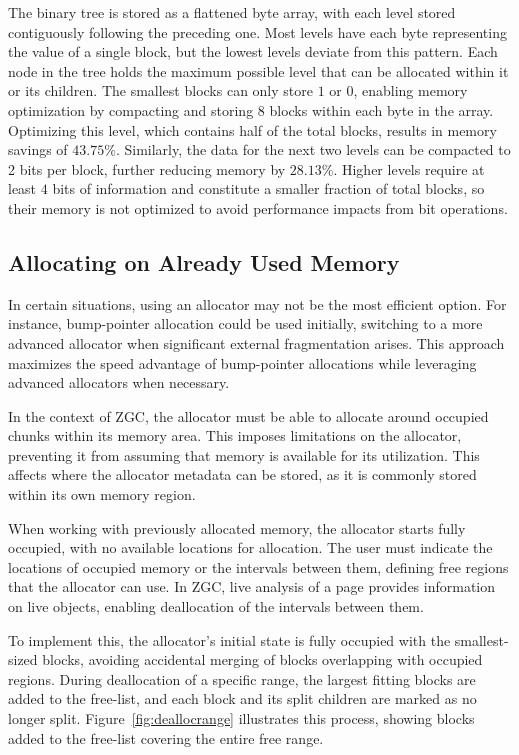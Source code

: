 The binary tree is stored as a flattened byte array, with each level stored contiguously following the preceding one. Most levels have each byte representing the value of a single block, but the lowest levels deviate from this pattern. Each node in the tree holds the maximum possible level that can be allocated within it or its children. The smallest blocks can only store $1$ or $0$, enabling memory optimization by compacting and storing 8 blocks within each byte in the array. Optimizing this level, which contains half of the total blocks, results in memory savings of $43.75$\%. Similarly, the data for the next two levels can be compacted to 2 bits per block, further reducing memory by $28.13$\%. Higher levels require at least $4$ bits of information and constitute a smaller fraction of total blocks, so their memory is not optimized to avoid performance impacts from bit operations.

\subsection{Allocating on Already Used Memory} \label{sec:freerangeexpl}
In certain situations, using an allocator may not be the most efficient option. For instance, bump-pointer allocation could be used initially, switching to a more advanced allocator when significant external fragmentation arises. This approach maximizes the speed advantage of bump-pointer allocations while leveraging advanced allocators when necessary.

In the context of ZGC, the allocator must be able to allocate around occupied chunks within its memory area. This imposes limitations on the allocator, preventing it from assuming that memory is available for its utilization. This affects where the allocator metadata can be stored, as it is commonly stored within its own memory region.

\newpage
When working with previously allocated memory, the allocator starts fully occupied, with no available locations for allocation. The user must indicate the locations of occupied memory or the intervals between them, defining free regions that the allocator can use. In ZGC, live analysis of a page provides information on live objects, enabling deallocation of the intervals between them.

To implement this, the allocator's initial state is fully occupied with the smallest-sized blocks, avoiding accidental merging of blocks overlapping with occupied regions. During deallocation of a specific range, the largest fitting blocks are added to the free-list, and each block and its split children are marked as no longer split. Figure~\ref{fig:deallocrange} illustrates this process, showing blocks added to the free-list covering the entire free range.

